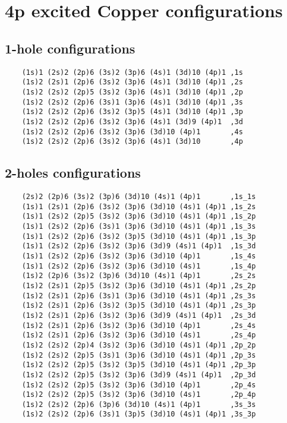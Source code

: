 
%

\chapter{4p excited Copper configurations}
\label{ann:confs}
\section{1-hole configurations}
\begin{lstlisting}
    (1s)1 (2s)2 (2p)6 (3s)2 (3p)6 (4s)1 (3d)10 (4p)1 ,1s
    (1s)2 (2s)1 (2p)6 (3s)2 (3p)6 (4s)1 (3d)10 (4p)1 ,2s
    (1s)2 (2s)2 (2p)5 (3s)2 (3p)6 (4s)1 (3d)10 (4p)1 ,2p
    (1s)2 (2s)2 (2p)6 (3s)1 (3p)6 (4s)1 (3d)10 (4p)1 ,3s
    (1s)2 (2s)2 (2p)6 (3s)2 (3p)5 (4s)1 (3d)10 (4p)1 ,3p
    (1s)2 (2s)2 (2p)6 (3s)2 (3p)6 (4s)1 (3d)9 (4p)1  ,3d
    (1s)2 (2s)2 (2p)6 (3s)2 (3p)6 (3d)10 (4p)1       ,4s
    (1s)2 (2s)2 (2p)6 (3s)2 (3p)6 (4s)1 (3d)10       ,4p    
\end{lstlisting}
\section{2-holes configurations}
\begin{lstlisting}
    (2s)2 (2p)6 (3s)2 (3p)6 (3d)10 (4s)1 (4p)1       ,1s_1s
    (1s)1 (2s)1 (2p)6 (3s)2 (3p)6 (3d)10 (4s)1 (4p)1 ,1s_2s
    (1s)1 (2s)2 (2p)5 (3s)2 (3p)6 (3d)10 (4s)1 (4p)1 ,1s_2p
    (1s)1 (2s)2 (2p)6 (3s)1 (3p)6 (3d)10 (4s)1 (4p)1 ,1s_3s
    (1s)1 (2s)2 (2p)6 (3s)2 (3p)5 (3d)10 (4s)1 (4p)1 ,1s_3p
    (1s)1 (2s)2 (2p)6 (3s)2 (3p)6 (3d)9 (4s)1 (4p)1  ,1s_3d
    (1s)1 (2s)2 (2p)6 (3s)2 (3p)6 (3d)10 (4p)1       ,1s_4s
    (1s)1 (2s)2 (2p)6 (3s)2 (3p)6 (3d)10 (4s)1       ,1s_4p
    (1s)2 (2p)6 (3s)2 (3p)6 (3d)10 (4s)1 (4p)1       ,2s_2s
    (1s)2 (2s)1 (2p)5 (3s)2 (3p)6 (3d)10 (4s)1 (4p)1 ,2s_2p
    (1s)2 (2s)1 (2p)6 (3s)1 (3p)6 (3d)10 (4s)1 (4p)1 ,2s_3s
    (1s)2 (2s)1 (2p)6 (3s)2 (3p)5 (3d)10 (4s)1 (4p)1 ,2s_3p
    (1s)2 (2s)1 (2p)6 (3s)2 (3p)6 (3d)9 (4s)1 (4p)1  ,2s_3d
    (1s)2 (2s)1 (2p)6 (3s)2 (3p)6 (3d)10 (4p)1       ,2s_4s
    (1s)2 (2s)1 (2p)6 (3s)2 (3p)6 (3d)10 (4s)1       ,2s_4p
    (1s)2 (2s)2 (2p)4 (3s)2 (3p)6 (3d)10 (4s)1 (4p)1 ,2p_2p
    (1s)2 (2s)2 (2p)5 (3s)1 (3p)6 (3d)10 (4s)1 (4p)1 ,2p_3s
    (1s)2 (2s)2 (2p)5 (3s)2 (3p)5 (3d)10 (4s)1 (4p)1 ,2p_3p
    (1s)2 (2s)2 (2p)5 (3s)2 (3p)6 (3d)9 (4s)1 (4p)1  ,2p_3d
    (1s)2 (2s)2 (2p)5 (3s)2 (3p)6 (3d)10 (4p)1       ,2p_4s
    (1s)2 (2s)2 (2p)5 (3s)2 (3p)6 (3d)10 (4s)1       ,2p_4p
    (1s)2 (2s)2 (2p)6 (3p)6 (3d)10 (4s)1 (4p)1       ,3s_3s
    (1s)2 (2s)2 (2p)6 (3s)1 (3p)5 (3d)10 (4s)1 (4p)1 ,3s_3p

\end{lstlisting}

